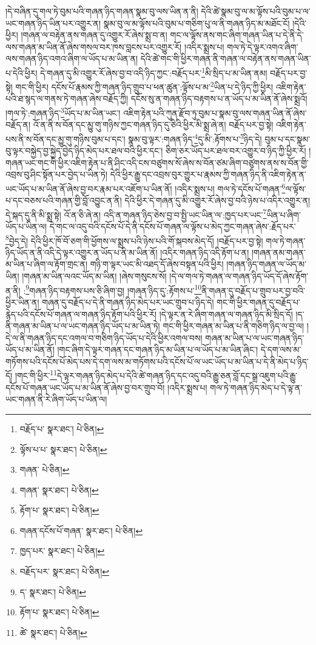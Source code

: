 །དེ་བཞིན་དུ་གལ་ཏེ་བུམ་པའི་གཞན་ཉིད་གཞན་སྣམ་བུ་ལས་ཡིན་ན་ནི། དེའི་ཚེ་སྣམ་བུ་ལ་མ་ལྟོས་པའི་བུམ་པ་ལ་ཡང་གཞན་ཉིད་ཡིན་པར་འགྱུར་ན། སྣམ་བུ་ལ་མ་ལྟོས་པའི་བུམ་པ་གཅིག་པུ་ལ་ནི་གཞན་ཉིད་མ་མཐོང་ངོ། །དེའི་ཕྱིར། །གཞན་ལ་བརྟེན་ནས་གཞན་དུ་འགྱུར་རོ་ཞེས་སྨྲ་བ་ན། གང་ལ་ལྟོས་ནས་གང་ཞིག་གཞན་ཡིན་པ་དེ་ནི་དེ་ལས་གཞན་མ་ཡིན་ནོ་ཞེས་གསལ་བར་ཁས་བླངས་པར་འགྱུར་རོ། །འདིར་སྨྲས་པ། གལ་ཏེ་དེ་ལྟར་འགའ་ཞིག་ལས་གཞན་ཉིད་འགའ་ཞིག་ལ་ཡོད་པ་མ་ཡིན་ན། དེའི་ཚེ་གང་གི་ཕྱིར་གཞན་ནི་གཞན་ལ་བརྟེན་ནས་གཞན་ཡིན་པ་དེའི་ཕྱིར། དེ་གཞན་དུ་མི་འགྱུར་རོ་ཞེས་བྱ་བ་འདི་ཉིད་ཀྱང་:བརྗོད་པར་\footnote{བརྗོད་པ་  སྣར་ཐང་།  པེ་ཅིན། }མི་སྲིད་པ་མ་ཡིན་ནམ། བརྗོད་པར་བྱ་སྟེ། གང་གི་ཕྱིར། དངོས་པོ་རྣམས་ཀྱི་གཞན་ཉིད་གྲུབ་པ་ཕན་ཚུན་:ལྟོས་པ་མ་\footnote{ལྟོས་པ་པ་  སྣར་ཐང་།  པེ་ཅིན། }ཡིན་པ་དེ་ཉིད་ཀྱི་ཕྱིར། འཇིག་རྟེན་པའི་ཐ་སྙད་ལ་གནས་ཏེ་གཞན་ཞེས་བརྗོད་ཀྱི། དངོས་སུ་ན་གཞན་ཉིད་བརྟགས་པ་ན་ཡོད་པ་མ་ཡིན་ནོ་ཞེས་སྨྲའོ། །གལ་ཏེ་:གཞན་ཉིད་\footnote{གཞན་  པེ་ཅིན། }ཡོད་པ་མ་ཡིན་ཡང་། འཇིག་རྟེན་པའི་ཀུན་རྫོབ་ཏུ་བུམ་པ་སྣམ་བུ་ལས་གཞན་ཡིན་ནོ་ཞེས་བརྗོད་ན། འོ་ན་ནི་ས་བོན་དང་མྱུ་གུ་གཉིས་ཀྱང་གཞན་ཉིད་དུ་ཅིའི་ཕྱིར་མི་སྨྲ་ཞེ་ན། བརྗོད་པར་བྱ་སྟེ། འཇིག་རྟེན་པས་ནི་ས་བོན་དང་མྱུ་གུ་གཉིས་བུམ་པ་དང་། སྣམ་བུ་ལྟར་:གཞན་ཉིད་\footnote{གཞན་  སྣར་ཐང་།  པེ་ཅིན། }དུ་མི་:རྟོགས་པ་\footnote{རྟོག་པ་  སྣར་ཐང་།  པེ་ཅིན། }ཉིད་དེ། བུམ་པ་དང་སྣམ་བུ་ལྟར་བསྐྱེད་བྱ་སྐྱེད་བྱེད་ཉིད་མེད་པར་ཐལ་བའི་ཕྱིར་དང་། ཅིག་ཅར་ཡོད་པར་ཐལ་བར་འགྱུར་བ་ཉིད་ཀྱི་ཕྱིར་རོ། །གཞན་ཡང་གང་གི་ཕྱིར་འཇིག་རྟེན་པ་ནི་ཤིང་འདི་ངས་བཙུགས་སོ་ཞེས་ས་བོན་ཙམ་ཞིག་བཙུགས་ནས་ས་བོན་གྱི་འབྲས་བུ་ཤིང་སྟོན་པར་བྱེད་པ་ཡིན་ཏེ། དེའི་ཕྱིར་རྒྱུ་དང་འབྲས་བུར་གྱུར་པ་རྣམས་ཀྱི་གཞན་ཉིད་ནི་འཇིག་རྟེན་ན་ཡང་ཡོད་པ་མ་ཡིན་ནོ་ཞེས་བྱ་བར་རྣམ་པར་འཇོག་པ་ཡིན་ནོ། །འདིར་སྨྲས་པ། གལ་ཏེ་དངོས་པོ་གཞན་\footnote{གཞན་དངོས་པོ་གཞན་  སྣར་ཐང་།  པེ་ཅིན། }ལ་ལྟོས་པ་དང་བཅས་པའི་གཞན་གྱི་བློ་འབྱུང་ན་ནི། དེའི་ཕྱིར་དེ་གཞན་དུ་མི་འགྱུར་རོ་ཞེས་བྱ་བའི་ཉེས་པ་འདིར་འགྱུར་ན། དེ་སྐད་དུ་ནི་མི་སྨྲ་སྟེ། འོ་ན་ཅི་ཞེ་ན། འདི་ན་གཞན་ཉིད་ཅེས་བྱ་བ་སྤྱི་ཡང་ཡིན་ལ་:ཁྱད་པར་ཡང་\footnote{ཁྱད་པར་  སྣར་ཐང་།  པེ་ཅིན། }ཡིན་པ་ཞིག་ཡོད་པ་ཡིན་ལ། དེ་གང་ལ་འདུ་བའི་དངོས་པོ་དེ་ནི་དངོས་པོ་གཞན་ལ་ལྟོས་པ་མེད་ཀྱང་གཞན་ཞེས་:རྗོད་པར་\footnote{བརྗོད་པར་  སྣར་ཐང་།  པེ་ཅིན། }བྱེད་དེ། དེའི་ཕྱིར་ཁོ་བོ་ཅག་གི་ཕྱོགས་ལ་སྨྲས་པའི་ཉེས་པའི་གོ་སྐབས་མེད་དོ། །བརྗོད་པར་བྱ་སྟེ། གལ་ཏེ་གཞན་ཉིད་ཡོད་ན་ནི་འདི་དེ་ལྟར་འགྱུར་ན་ཡོད་པ་ནི་མ་ཡིན་ནོ། །འདིར་གཞན་ཉིད་འདི་རྟོག་པ་ན། །གཞན་ནམ་གཞན་མ་ཡིན་པ་ཞིག་ལ་རྟོག་གྲང་ན། གཉི་ག་ལྟར་ཡང་མི་འཐད་དོ་ཞེས་བསྟན་པའི་ཕྱིར། །གཞན་ཉིད་གཞན་ལ་ཡོད་མ་ཡིན། །གཞན་མ་ཡིན་ལའང་ཡོད་མ་ཡིན། །ཞེས་གསུངས་སོ། །དེ་ལ་གལ་ཏེ་གཞན་ལ་གཞན་ཉིད་ཡོད་དོ་ཞེས་རྟོག་ན་ནི། :\footnote{ད་  སྣར་ཐང་།  པེ་ཅིན། }གཞན་ཉིད་བརྟགས་པས་ཅི་ཞིག་བྱ། །གཞན་ཉིད་དུ་:རྟོགས་པ་\footnote{རྟོག་པ་  སྣར་ཐང་།  པེ་ཅིན། }ནི་གཞན་དུ་བརྗོད་པ་གྲུབ་པར་བྱ་བའི་ཕྱིར་ཡིན་ན། གཞན་དུ་བརྗོད་པ་དེ་ནི་གཞན་ཉིད་མེད་པར་ཡང་གྲུབ་པ་ཉིད་དེ། གང་གི་ཕྱིར་གཞན་དུ་བརྗོད་པ་རྙེད་པའི་དངོས་པོ་གཞན་ལ་གཞན་ཉིད་རྟོག་པའི་ཕྱིར་རོ། །དེ་ལྟར་ན་རེ་ཞིག་གཞན་ལ་གཞན་ཉིད་མི་སྲིད་དོ། །ད་ནི་གཞན་མ་ཡིན་པ་ལ་ཡང་གཞན་ཉིད་ཡོད་པ་མ་ཡིན་ཏེ། གང་གི་ཕྱིར་གཞན་མ་ཡིན་པ་ནི་གཅིག་ཉིད་ལ་བྱ་ལ། །དེ་ལ་ནི་གཞན་ཉིད་དང་འགལ་བ་གཅིག་ཉིད་ཡོད་པ་དེའི་ཕྱིར་འགལ་བས། གཞན་མ་ཡིན་པ་ལ་ཡང་གཞན་ཉིད་ཡོད་པ་མ་ཡིན་ནོ། །གང་ཞིག་དེ་ལྟར་གཞན་དང་གཞན་ཉིད་མ་ཡིན་པ་ལ་ཡོད་པ་མ་ཡིན་ཞིང་། དེ་དག་ལས་མ་གཏོགས་པའི་དངོས་པོ་མེད་པས་དེ་དག་ལས་མ་གཏོགས་པའི་དངོས་པོ་ལ་ཡང་ཡོད་པ་མ་ཡིན་པ་དེ་ནི་མེད་པ་ཉིད་དོ། །གང་གི་ཕྱིར་\footnote{ཚེ་  སྣར་ཐང་།  པེ་ཅིན། }དེ་ལྟར་གཞན་ཉིད་མེད་པ་དེའི་ཚེ་གཞན་ཉིད་དང་འདུ་བའི་རྒྱུ་ཅན་བློ་དང་སྒྲ་འཇུག་པའི་རྒྱུ་དངོས་པོ་གཞན་ཡང་ཡོད་པ་མ་ཡིན་ནོ་ཞེས་བྱ་བར་གྲུབ་བོ། །འདིར་སྨྲས་པ། གལ་ཏེ་གཞན་ཉིད་མེད་པ་དེ་ལྟ་ན་ཡང་གཞན་ནི་རེ་ཞིག་ཡོད་པ་ཡིན་ལ། 